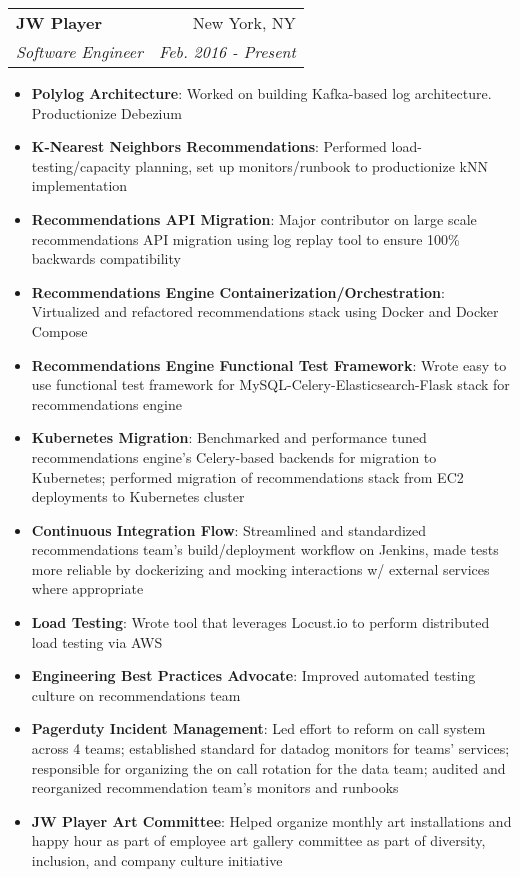 \documentclass[letterpaper,11pt]{article}
\makeatletter
\newcommand{\resumeItem}[2]{
  \item\small{
    \textbf{#1}{: #2 \vspace{-2pt}}
  }
}
\newcommand{\resumeSubheading}[4]{
  \vspace{-1pt}\item
    \begin{tabular*}{0.97\textwidth}{l@{\extracolsep{\fill}}r}
      \textbf{#1} & #2 \\
      \textit{\small#3} & \textit{\small #4} \\
    \end{tabular*}\vspace{-5pt}
}
\newcommand{\resumeItemListStart}{\begin{itemize}}
\newcommand{\resumeItemListEnd}{\end{itemize}\vspace{-5pt}}
\makeatother
\begin{document}
    \resumeSubheading
      {JW Player}{New York, NY}
      {Software Engineer}{Feb. 2016 - Present}
      \resumeItemListStart
        \resumeItem{Polylog Architecture}
          {Worked on building Kafka-based log architecture. Productionize Debezium}
        \resumeItem{K-Nearest Neighbors Recommendations}
          {Performed load-testing/capacity planning, set up monitors/runbook to productionize kNN implementation}
        \resumeItem{Recommendations API Migration}
          {Major contributor on large scale recommendations API migration using log replay tool to ensure 100\% backwards compatibility}
        \resumeItem{Recommendations Engine Containerization/Orchestration}
          {Virtualized and refactored recommendations stack using Docker and Docker Compose}
        \resumeItem{Recommendations Engine Functional Test Framework}
          {Wrote easy to use functional test framework for MySQL-Celery-Elasticsearch-Flask stack for recommendations engine}
        \resumeItem{Kubernetes Migration}
          {Benchmarked and performance tuned recommendations engine's Celery-based backends for migration to Kubernetes; performed migration of recommendations stack from EC2 deployments to Kubernetes cluster}
        \resumeItem{Continuous Integration Flow}
          {Streamlined and standardized recommendations team's build/deployment workflow on Jenkins, made tests more reliable by dockerizing and mocking interactions w/ external services where appropriate}
        \resumeItem{Load Testing}
          {Wrote tool that leverages Locust.io to perform distributed load testing via AWS}
        \resumeItem{Engineering Best Practices Advocate}
          {Improved automated testing culture on recommendations team}
        \resumeItem{Pagerduty Incident Management}
          {Led effort to reform on call system across 4 teams; established standard for datadog monitors for teams' services; responsible for organizing the on call rotation for the data team; audited and reorganized recommendation team's monitors and runbooks}
        \resumeItem{JW Player Art Committee}
          {Helped organize monthly art installations and happy hour as part of employee art gallery committee as part of diversity, inclusion, and company culture initiative}
      \resumeItemListEnd
\end{document}
